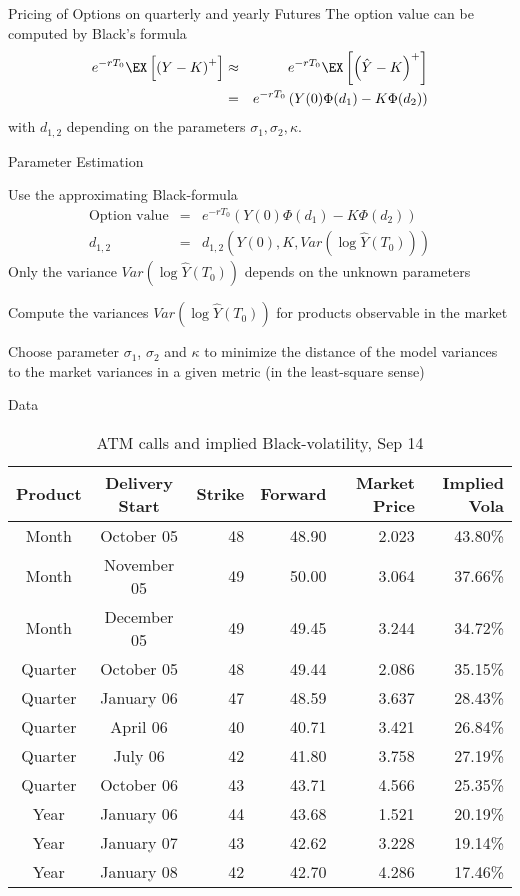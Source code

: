 {Pricing of Options on quarterly and yearly Futures}
The option value can be computed by Black's formula
\begin{eqnarray*}
e^{-rT_0}\EX\left[\left(Y-K\right)^+\right]&\approx & e^{-rT_0}\EX\left[\left(\hat{Y}-K\right)^+\right]\\
& = &e^{-rT_0}\left(Y(0)\Phi(d_1) - K\Phi(d_2)\right)
\end{eqnarray*}
with $d_{1,2}$ depending on the parameters $\sigma_1, \sigma_2, \kappa$.

{Parameter Estimation}
\item<1-> Use the approximating Black-formula
    \begin{eqnarray*}
        \textrm{Option value}&=&    e^{-rT_0}\left(Y(0)\Phi (d_1)-K\Phi(d_2) \right)
\\
        d_{1,2} & = & d_{1,2}\left(Y(0),K,Var(\log \hat{Y}(T_0))\right)
    \end{eqnarray*}
        Only the variance $Var(\log \hat{Y}(T_0))$ depends on the unknown parameters

\item<2-> Compute the variances $Var(\log\hat{Y}(T_0))$ for products observable in the market
\item<3-> Choose parameter $\sigma_1$, $\sigma_2$ and $\kappa$ to minimize the distance of the model variances
to the market variances in a given metric (in the least-square sense)

{Data}
{\small \begin{table}[btp]
\begin{center}
\begin{tabular}{ccrrrr}
Product     & Delivery Start    & Strike    &   Forward & Market Price  &Implied Vola \\
\hline
Month   &October 05     &48 &48.90&2.023&43.80\%\\
Month   &November 05        &49 &50.00&3.064&37.66\%\\
Month   &December 05        &49 &49.45&3.244&34.72\%\\
\hline
Quarter & October 05        &48 &49.44&2.086&35.15\%\\
Quarter & January 06        &47 &48.59&3.637&28.43\%\\
Quarter & April 06          &40 &40.71&3.421&26.84\%\\
Quarter & July 06           &42 &41.80&3.758&27.19\%\\
Quarter & October 06        &43 &43.71&4.566&25.35\%\\
\hline
Year    &January 06     &44 &43.68&1.521&20.19\%\\
Year    &January 07     &43 &42.62&3.228&19.14\%\\
Year    &January 08     &42 &42.70&4.286&17.46\%\\
\end{tabular}
\caption{ATM calls and implied Black-volatility, Sep 14}
\label{fig:data}
\end{center}
\end{table}
}

